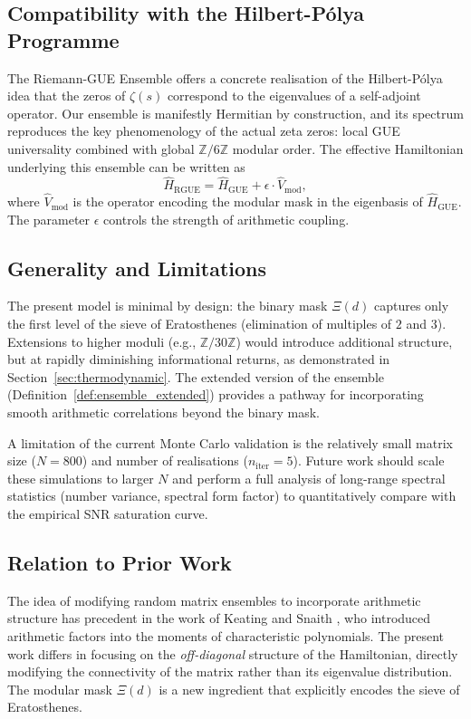 \documentclass[12pt,a4paper]{article}
\theoremstyle{plain}
\theoremstyle{definition}
\theoremstyle{remark}
\begin{document}
\subsection{Compatibility with the Hilbert-Pólya Programme}
The Riemann-GUE Ensemble offers a concrete realisation of the Hilbert-Pólya idea that the zeros of $\zeta(s)$ correspond to the eigenvalues of a self-adjoint operator. Our ensemble is manifestly Hermitian by construction, and its spectrum reproduces the key phenomenology of the actual zeta zeros: local GUE universality combined with global $\mathbb{Z}/6\mathbb{Z}$ modular order. The effective Hamiltonian underlying this ensemble can be written as
\begin{equation}
\hat{H}_{\text{RGUE}} = \hat{H}_{\text{GUE}} + \epsilon \cdot \hat{V}_{\text{mod}},
\label{eq:hamiltonian}
\end{equation}
where $\hat{V}_{\text{mod}}$ is the operator encoding the modular mask in the eigenbasis of $\hat{H}_{\text{GUE}}$. The parameter $\epsilon$ controls the strength of arithmetic coupling.

\subsection{Generality and Limitations}
The present model is minimal by design: the binary mask $\Xi(d)$ captures only the first level of the sieve of Eratosthenes (elimination of multiples of $2$ and $3$). Extensions to higher moduli (e.g., $\mathbb{Z}/30\mathbb{Z}$) would introduce additional structure, but at rapidly diminishing informational returns, as demonstrated in Section~\ref{sec:thermodynamic}. The extended version of the ensemble (Definition~\ref{def:ensemble_extended}) provides a pathway for incorporating smooth arithmetic correlations beyond the binary mask.

A limitation of the current Monte Carlo validation is the relatively small matrix size ($N=800$) and number of realisations ($n_{\text{iter}}=5$). Future work should scale these simulations to larger $N$ and perform a full analysis of long-range spectral statistics (number variance, spectral form factor) to quantitatively compare with the empirical SNR saturation curve.

\subsection{Relation to Prior Work}
The idea of modifying random matrix ensembles to incorporate arithmetic structure has precedent in the work of Keating and Snaith \cite{keatingsnaith2000}, who introduced arithmetic factors into the moments of characteristic polynomials. The present work differs in focusing on the \emph{off-diagonal} structure of the Hamiltonian, directly modifying the connectivity of the matrix rather than its eigenvalue distribution. The modular mask $\Xi(d)$ is a new ingredient that explicitly encodes the sieve of Eratosthenes.
\end{document}
